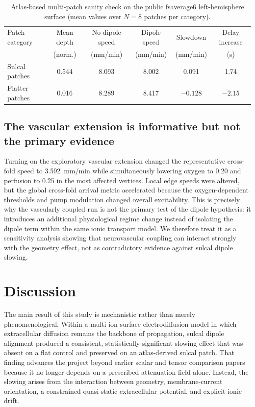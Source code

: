 \documentclass[12pt]{article}
\begin{document}
\begin{table}[t]
\centering
\small
\caption{Atlas-based multi-patch sanity check on the public fsaverage6 left-hemisphere surface (mean values over $N=8$ patches per category).}
\label{tab:atlas}
\begin{tabular}{@{}lccccc@{}}
\toprule
Patch category & Mean depth & No dipole speed & Dipole speed & Slowdown & Delay increase \\
 & (norm.) & (mm/min) & (mm/min) & (mm/min) & (s) \\
\midrule
Sulcal patches & 0.544 & 8.093 & 8.002 & 0.091 & 1.74 \\
Flatter patches & 0.016 & 8.289 & 8.417 & $-0.128$ & $-2.15$ \\
\bottomrule
\end{tabular}
\end{table}

\subsection{The vascular extension is informative but not the primary evidence}

Turning on the exploratory vascular extension changed the representative cross-fold speed to 3.592~mm/min while simultaneously lowering oxygen to 0.20 and perfusion to 0.25 in the most affected vertices. Local edge speeds were altered, but the global cross-fold arrival metric accelerated because the oxygen-dependent thresholds and pump modulation changed overall excitability. This is precisely why the vascularly coupled run is not the primary test of the dipole hypothesis: it introduces an additional physiological regime change instead of isolating the dipole term within the same ionic transport model. We therefore treat it as a sensitivity analysis showing that neurovascular coupling can interact strongly with the geometry effect, not as contradictory evidence against sulcal dipole slowing.

\section{Discussion}

The main result of this study is mechanistic rather than merely phenomenological. Within a multi-ion surface electrodiffusion model in which extracellular diffusion remains the backbone of propagation, sulcal dipole alignment produced a consistent, statistically significant slowing effect that was absent on a flat control and preserved on an atlas-derived sulcal patch. That finding advances the project beyond earlier scalar and tensor comparison papers because it no longer depends on a prescribed attenuation field alone. Instead, the slowing arises from the interaction between geometry, membrane-current orientation, a constrained quasi-static extracellular potential, and explicit ionic drift.
\end{document}
